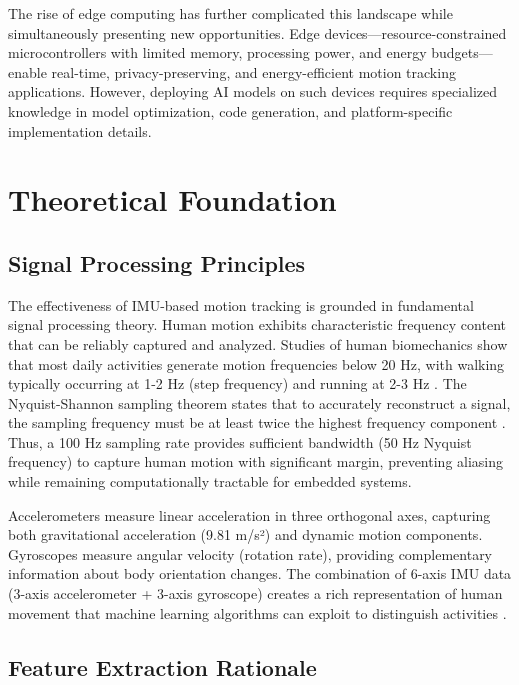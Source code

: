 The rise of edge computing has further complicated this landscape while simultaneously presenting new opportunities. Edge devices—resource-constrained microcontrollers with limited memory, processing power, and energy budgets—enable real-time, privacy-preserving, and energy-efficient motion tracking applications. However, deploying AI models on such devices requires specialized knowledge in model optimization, code generation, and platform-specific implementation details.

\section{Theoretical Foundation}

\subsection{Signal Processing Principles}

The effectiveness of IMU-based motion tracking is grounded in fundamental signal processing theory. Human motion exhibits characteristic frequency content that can be reliably captured and analyzed. Studies of human biomechanics show that most daily activities generate motion frequencies below 20 Hz, with walking typically occurring at 1-2 Hz (step frequency) and running at 2-3 Hz \cite{whittle2014gait}. The Nyquist-Shannon sampling theorem states that to accurately reconstruct a signal, the sampling frequency must be at least twice the highest frequency component \cite{oppenheim1999discrete}. Thus, a 100 Hz sampling rate provides sufficient bandwidth (50 Hz Nyquist frequency) to capture human motion with significant margin, preventing aliasing while remaining computationally tractable for embedded systems.

Accelerometers measure linear acceleration in three orthogonal axes, capturing both gravitational acceleration (9.81 m/s²) and dynamic motion components. Gyroscopes measure angular velocity (rotation rate), providing complementary information about body orientation changes. The combination of 6-axis IMU data (3-axis accelerometer + 3-axis gyroscope) creates a rich representation of human movement that machine learning algorithms can exploit to distinguish activities \cite{filippeschi2017survey_imu}.

\subsection{Feature Extraction Rationale}

